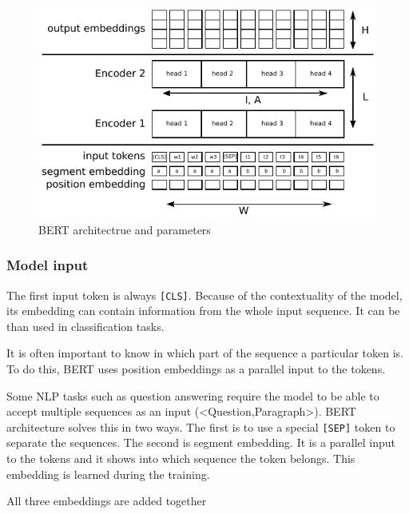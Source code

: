 \documentclass[
  digital, %
  table,   %
  twoside, %
  lof,     %
  lot,     %
]{fithesis3}
\begin{document}
\begin{figure}[h]
  \label{fig:bert}
  \begin{center}
    \includegraphics[width=\linewidth]{img/bert.pdf}
  \end{center}
  \vspace{-0.5cm}
  \caption{BERT architectrue and parameters}
\end{figure}

\subsubsection{Model input}

The first input token is always \texttt{[CLS]}. Because of the contextuality of the model, its embedding can contain information from the whole input sequence. It can be than used in classification tasks.

It is often important to know in which part of the sequence a particular token is. To do this, BERT uses position embeddings as a parallel input to the tokens.

Some NLP tasks such as question answering require the model to be able to accept multiple sequences as an input (<Question,Paragraph>). BERT architecture solves this in two ways. The first is to use a special \texttt{[SEP]} token to separate the sequences. The second is segment embedding. It is a parallel input to the tokens and it shows into which sequence the token belongs. This embedding is learned during the training. 

All three embeddings are added together

\subsubsection{}
\end{document}
